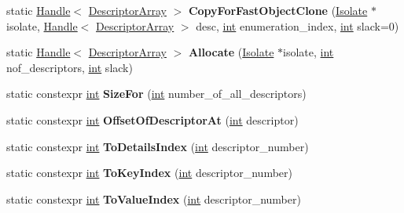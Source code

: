 \begin{DoxyCompactItemize}
static \mbox{\hyperlink{classv8_1_1internal_1_1Handle}{Handle}}$<$ \mbox{\hyperlink{classv8_1_1internal_1_1DescriptorArray}{Descriptor\+Array}} $>$ {\bfseries Copy\+For\+Fast\+Object\+Clone} (\mbox{\hyperlink{classv8_1_1internal_1_1Isolate}{Isolate}} $\ast$isolate, \mbox{\hyperlink{classv8_1_1internal_1_1Handle}{Handle}}$<$ \mbox{\hyperlink{classv8_1_1internal_1_1DescriptorArray}{Descriptor\+Array}} $>$ desc, \mbox{\hyperlink{classint}{int}} enumeration\+\_\+index, \mbox{\hyperlink{classint}{int}} slack=0)
\item 
\mbox{\label{classv8_1_1internal_1_1DescriptorArray_a27d7452b18441efdaf4cb8100e28ed18}} 
static \mbox{\hyperlink{classv8_1_1internal_1_1Handle}{Handle}}$<$ \mbox{\hyperlink{classv8_1_1internal_1_1DescriptorArray}{Descriptor\+Array}} $>$ {\bfseries Allocate} (\mbox{\hyperlink{classv8_1_1internal_1_1Isolate}{Isolate}} $\ast$isolate, \mbox{\hyperlink{classint}{int}} nof\+\_\+descriptors, \mbox{\hyperlink{classint}{int}} slack)
\item 
\mbox{\label{classv8_1_1internal_1_1DescriptorArray_a830a95ee07bd34cf527075cafcd6df8a}} 
static constexpr \mbox{\hyperlink{classint}{int}} {\bfseries Size\+For} (\mbox{\hyperlink{classint}{int}} number\+\_\+of\+\_\+all\+\_\+descriptors)
\item 
\mbox{\label{classv8_1_1internal_1_1DescriptorArray_ae54af5784a6aad3efe92d2f0822ff2a4}} 
static constexpr \mbox{\hyperlink{classint}{int}} {\bfseries Offset\+Of\+Descriptor\+At} (\mbox{\hyperlink{classint}{int}} descriptor)
\item 
\mbox{\label{classv8_1_1internal_1_1DescriptorArray_afc12971b634c61bcfd8183f8212df046}} 
static constexpr \mbox{\hyperlink{classint}{int}} {\bfseries To\+Details\+Index} (\mbox{\hyperlink{classint}{int}} descriptor\+\_\+number)
\item 
\mbox{\label{classv8_1_1internal_1_1DescriptorArray_a529267edc2c7235d69af39a232d0c69c}} 
static constexpr \mbox{\hyperlink{classint}{int}} {\bfseries To\+Key\+Index} (\mbox{\hyperlink{classint}{int}} descriptor\+\_\+number)
\item 
\mbox{\label{classv8_1_1internal_1_1DescriptorArray_a7567f6bbed10f981183742b01d17dd7c}} 
static constexpr \mbox{\hyperlink{classint}{int}} {\bfseries To\+Value\+Index} (\mbox{\hyperlink{classint}{int}} descriptor\+\_\+number)
\end{DoxyCompactItemize}
